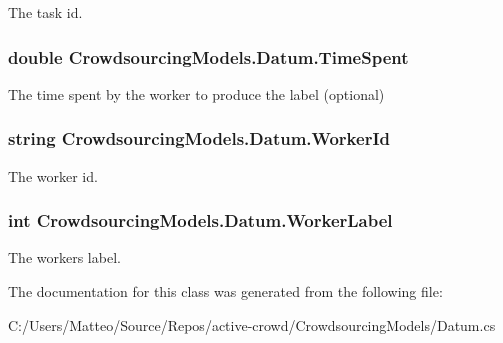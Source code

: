 The task id. 

\hypertarget{class_crowdsourcing_models_1_1_datum_a86eda72a08cbb7ac25a4898cefc91161}{}
\subsubsection[{Time\+Spent}]{\setlength{\rightskip}{0pt plus 5cm}double Crowdsourcing\+Models.\+Datum.\+Time\+Spent}\label{class_crowdsourcing_models_1_1_datum_a86eda72a08cbb7ac25a4898cefc91161}


The time spent by the worker to produce the label (optional) 

\hypertarget{class_crowdsourcing_models_1_1_datum_a0cd6c2a571200b43b79db48f2bcdb0f4}{}
\subsubsection[{Worker\+Id}]{\setlength{\rightskip}{0pt plus 5cm}string Crowdsourcing\+Models.\+Datum.\+Worker\+Id}\label{class_crowdsourcing_models_1_1_datum_a0cd6c2a571200b43b79db48f2bcdb0f4}


The worker id. 

\hypertarget{class_crowdsourcing_models_1_1_datum_a12f58ddc5efdea89aa99d2fbe944744f}{}
\subsubsection[{Worker\+Label}]{\setlength{\rightskip}{0pt plus 5cm}int Crowdsourcing\+Models.\+Datum.\+Worker\+Label}\label{class_crowdsourcing_models_1_1_datum_a12f58ddc5efdea89aa99d2fbe944744f}


The worker\textquotesingle{}s label. 



The documentation for this class was generated from the following file\+:\begin{DoxyCompactItemize}
\item 
C\+:/\+Users/\+Matteo/\+Source/\+Repos/active-\/crowd/\+Crowdsourcing\+Models/Datum.\+cs\end{DoxyCompactItemize}
